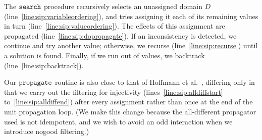 \documentclass[a4paper,UKenglish]{lipics-v2018}
\newcommand{\siplineref}[1]{line~\ref{line:sip:#1}}
\newcommand{\siplinerangeref}[2]{lines~\ref{line:sip:#1} to~\ref{line:sip:#2}}
\begin{document}
The $\FuncSty{search}$ procedure recursively selects an unassigned domain $D$
(\siplineref{variableordering}), and tries assigning
it each of its remaining values in turn (\siplineref{valueordering}). The effects of this assignment
are propagated (\siplineref{dopropagate}). If an
inconsistency is detected, we continue and try another value; otherwise, we recurse
(\siplineref{recurse}) until a solution is found. Finally, if we run out of values, we backtrack
(\siplineref{backtrack}).

Our $\FuncSty{propagate}$ routine is also close to that of Hoffmann et al.\ \cite{DBLP:conf/aaai/HoffmannMR17},
differing only in that we carry out the filtering for injectivity
(\siplinerangeref{alldiffstart}{alldiffend}) after every assignment rather than once at the end of
the unit propagation loop. (We make this change because the all-different propagator used is not
idempotent, and we wish to avoid an odd interaction when we introduce nogood filtering.)
\end{document}
